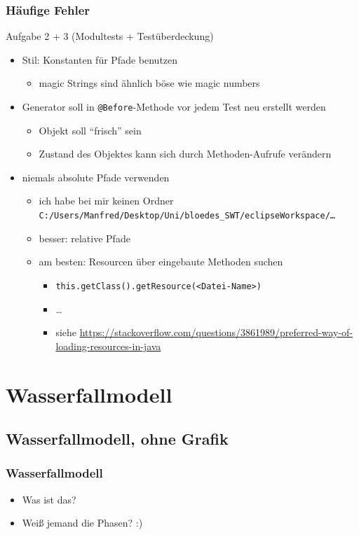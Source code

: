 \documentclass[18pt]{beamer}
\begin{document}
\begin{frame}
	\frametitle{Häufige Fehler}
	\begin{block}{Aufgabe 2 + 3 (Modultests + Testüberdeckung)}
		\begin{itemize}
			\item Stil: Konstanten für Pfade benutzen
			\begin{itemize}
				\item magic Strings sind ähnlich böse wie magic numbers
			\end{itemize}
			\pause
			\item Generator soll in \texttt{@Before}-Methode vor jedem Test neu erstellt werden
			\begin{itemize}
				\item Objekt soll \enquote{frisch} sein
				\item Zustand des Objektes kann sich durch Methoden-Aufrufe verändern
			\end{itemize}
			\pause
			\item niemals absolute Pfade verwenden
			\begin{itemize}
				\item ich habe bei mir keinen Ordner \texttt{C:/Users/Manfred/Desktop/Uni/bloedes\_SWT/eclipseWorkspace/\dots}
				\item besser: relative Pfade 
				\item am besten: Resourcen über eingebaute Methoden suchen
				\begin{itemize}
					\item \texttt{this.getClass().getResource(<Datei-Name>)}
					\item \dots
					\item siehe \url{https://stackoverflow.com/questions/3861989/preferred-way-of-loading-resources-in-java}
				\end{itemize}
			\end{itemize}
		\end{itemize}
	\end{block}
\end{frame}

\section{Wasserfallmodell}
	\subsection{Wasserfallmodell, ohne Grafik}
	\begin{frame}
		\frametitle{Wasserfallmodell}
		\begin{itemize}
			\item Was ist das? 
			\item Weiß jemand die Phasen? :)
		\end{itemize}
	\end{frame}
	
\end{document}
